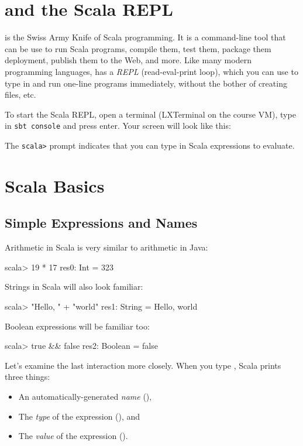\documentclass{book}
\begin{document}
\section{\sbt{} and the Scala REPL}

\sbt{} is the Swiss Army Knife of Scala programming. It is a command-line tool
that can be use to run Scala programs, compile them, test them, package them
deployment, publish them to the Web, and more. Like many modern programming
languages, \sbt{} has a \emph{REPL} (read-eval-print loop), which you can use to
type in and run one-line programs immediately, without the bother of creating
files, etc.

To start the Scala REPL, open a terminal (LXTerminal on the course VM),
type in \verb|sbt console| and press enter. Your screen will look like this:
%

The \verb|scala>| prompt indicates that you can type in Scala expressions to evaluate.

\section{Scala Basics}

\subsection{Simple Expressions and Names}

Arithmetic in Scala is very similar to arithmetic in Java:

\begin{console}
scala> 19 * 17
res0: Int = 323
\end{console}

Strings in Scala will also look familiar:

\begin{console}
scala> "Hello, " + "world"
res1: String = Hello, world
\end{console}

Boolean expressions will be familiar too:

\begin{console}
scala> true && false
res2: Boolean = false
\end{console}

Let's examine the last interaction more closely. When you type ,
Scala prints three things:
%
\begin{itemize}
\item An automatically-generated \emph{name} (),
\item The \emph{type} of the expression (), and
\item The \emph{value} of the expression ().
\end{itemize}
\end{document}
